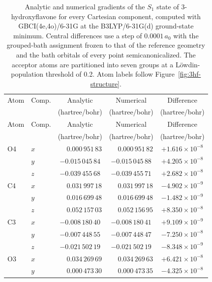 \begin{longtable}{llccc}
  \caption{Analytic and numerical gradients of the $S_1$ state of 3-hydroxyflavone for every Cartesian component, computed with GBCI(4e,4o)/6-31G at the B3LYP/6-31G(d) ground-state minimum. Central differences use a step of $0.0001\,a_0$ with the grouped-bath assignment frozen to that of the reference geometry and the bath orbitals of every point semicanonicalized. The acceptor atoms are partitioned into seven groups at a L\"owdin-population threshold of 0.2. Atom labels follow Figure~\ref{fig:3hf-structure}.}\\
  \hline
  Atom & Comp. & Analytic & Numerical & Difference \\
   & & (hartree/bohr) & (hartree/bohr) & (hartree/bohr) \\
  \hline
  \endfirsthead
  \hline
  Atom & Comp. & Analytic & Numerical & Difference \\
   & & (hartree/bohr) & (hartree/bohr) & (hartree/bohr) \\
  \hline
  \endhead
  O4  & $x$ & $\phantom{-}0.000\,951\,83$ & $\phantom{-}0.000\,951\,82$ & $+1.616 \times 10^{-8}$ \\
      & $y$ & $-0.015\,045\,84$ & $-0.015\,045\,88$ & $+4.205 \times 10^{-8}$ \\
      & $z$ & $-0.039\,455\,68$ & $-0.039\,455\,71$ & $+2.682 \times 10^{-8}$ \\[2pt]
  C4  & $x$ & $\phantom{-}0.031\,997\,18$ & $\phantom{-}0.031\,997\,18$ & $-4.902 \times 10^{-9}$ \\
      & $y$ & $\phantom{-}0.016\,699\,48$ & $\phantom{-}0.016\,699\,48$ & $-1.482 \times 10^{-9}$ \\
      & $z$ & $\phantom{-}0.052\,157\,03$ & $\phantom{-}0.052\,156\,95$ & $+8.350 \times 10^{-8}$ \\[2pt]
  C3  & $x$ & $-0.008\,180\,40$ & $-0.008\,180\,41$ & $+9.109 \times 10^{-9}$ \\
      & $y$ & $-0.007\,448\,55$ & $-0.007\,448\,47$ & $-7.250 \times 10^{-8}$ \\
      & $z$ & $-0.021\,502\,19$ & $-0.021\,502\,19$ & $-8.348 \times 10^{-9}$ \\[2pt]
  O3  & $x$ & $\phantom{-}0.034\,269\,69$ & $\phantom{-}0.034\,269\,63$ & $+6.421 \times 10^{-8}$ \\
      & $y$ & $\phantom{-}0.000\,473\,30$ & $\phantom{-}0.000\,473\,35$ & $-4.325 \times 10^{-8}$ \\

\end{longtable}
